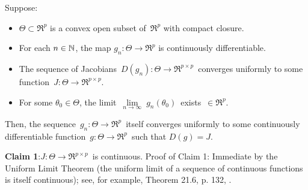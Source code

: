\clearpage

\begin{lemma}
\mbox{}\vskip 0.1cm
\noindent
Suppose:
\begin{itemize}
\item
	$\Theta \subset \Re^{p}$ is a convex open subset of \,$\Re^{p}$ with compact closure.
\item
	For each $n\in\mathbb{N}$, the map $g_{n} : \Theta \longrightarrow \Re^{p}$ is continuously differentiable.
\item
	The sequence of Jacobians
	\,$D(g_{n}) : \Theta \longrightarrow \Re^{p \times p}$\,
	converges uniformly to some function
	\,$J : \Theta \longrightarrow \Re^{p \times p}$.
\item
	For some $\theta_{0} \in \Theta$, the limit
	\,$\underset{n\rightarrow\infty}{\lim}\;g_{n}(\theta_{0})$\,
	exists \,$\in \Re^{p}$.
\end{itemize}
Then, the sequence
\,$g_{n} : \Theta \longrightarrow \Re^{p}$\,
itself converges uniformly to some continuously differentiable function
\,$g : \Theta \longrightarrow \Re^{p}$\,
such that $D(g) = J$.
\end{lemma}
\proof

\vskip 0.5cm
\noindent
\textbf{Claim 1}:\quad $J : \Theta \longrightarrow \Re^{p \times p}$\, is continuous.
\vskip 0.1cm
\noindent
Proof of Claim 1:\quad
Immediate by the Uniform Limit Theorem (the uniform limit of a sequence of continuous functions is itself continuous);
see, for example, Theorem 21.6, p. 132, \cite{Munkres2000}.

